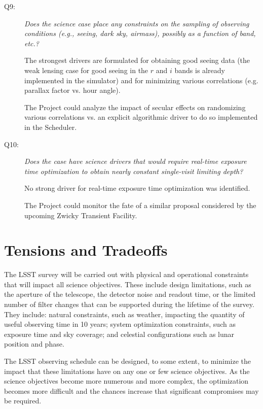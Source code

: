 \begin{description}
\item[Q9:] {\it Does the science case place any constraints on the
sampling of observing conditions (e.g., seeing, dark sky, airmass),
possibly as a function of band, etc.?}

The strongest drivers are formulated for obtaining good seeing data (the
weak lensing case for good seeing in the $r$ and $i$ bands is already
implemented in the simulator) and for minimizing various correlations
(e.g. parallax factor vs. hour angle).

The Project could analyze the impact of secular effects on randomizing
various correlations vs. an explicit algorithmic driver to do so
implemented in the Scheduler.


\item[Q10:] {\it Does the case have science drivers that would require
real-time exposure time optimization to obtain nearly constant
single-visit limiting depth?}

No strong driver for real-time exposure time optimization was
identified.

The Project could monitor the fate of a similar proposal considered by
the upcoming Zwicky Transient Facility.

\end{description}



\section{Tensions and Tradeoffs}


The LSST survey will be carried out with physical and operational
constraints that will impact all science objectives.  These include
design limitations, such as the aperture of the telescope, the detector
noise and readout time, or the limited number of filter changes that
can be supported during the lifetime of the survey.  They include:
natural constraints, such as weather, impacting the quantity of useful observing time
in 10 years; system optimization constraints, such as
exposure time and sky coverage; and celestial configurations such as lunar position and phase.

The LSST observing schedule can be designed, to some extent, to minimize
the impact that these limitations have on any one or few science
objectives. As the science objectives become more numerous and more
complex, the optimization becomes more difficult and the chances
increase that significant compromises may be required.

